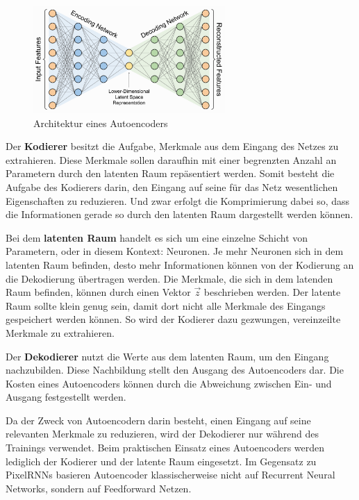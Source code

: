 \begin{figure}[H]
   \centering
   \includegraphics[width=0.65\textwidth]{images/Generative Networks/autoencoder_architecture.png}
   \caption{Architektur eines Autoencoders}
   \label{fig:Autoencoder}
\end{figure}

Der \textbf{Kodierer} besitzt die Aufgabe, Merkmale aus dem Eingang des Netzes zu extrahieren. Diese Merkmale sollen daraufhin mit einer begrenzten Anzahl an Parametern durch den latenten Raum repäsentiert werden. Somit besteht die Aufgabe des Kodierers darin, den Eingang auf seine für das Netz wesentlichen Eigenschaften zu reduzieren. Und zwar erfolgt die Komprimierung dabei so, dass die Informationen gerade so durch den latenten Raum dargestellt werden können. 

Bei dem \textbf{latenten Raum} handelt es sich um eine einzelne Schicht von Parametern, oder in diesem Kontext: Neuronen. Je mehr Neuronen sich in dem latenten Raum befinden, desto mehr Informationen können von der Kodierung an die Dekodierung übertragen werden. Die Merkmale, die sich in dem latenden Raum befinden, können durch einen Vektor $\vec{z}$ beschrieben werden. Der latente Raum sollte klein genug sein, damit dort nicht alle Merkmale des Eingangs gespeichert werden können. So wird der Kodierer dazu gezwungen, vereinzeilte Merkmale zu extrahieren. 

Der \textbf{Dekodierer} nutzt die Werte aus dem latenten Raum, um den Eingang nachzubilden. Diese Nachbildung stellt den Ausgang des Autoencoders dar. Die Kosten eines Autoencoders können durch die Abweichung zwischen Ein- und Ausgang festgestellt werden. 

Da der Zweck von Autoencodern darin besteht, einen Eingang auf seine relevanten Merkmale zu reduzieren, wird der Dekodierer nur während des Trainings verwendet. Beim praktischen Einsatz eines Autoencoders werden lediglich der Kodierer und der latente Raum eingesetzt. Im Gegensatz zu \acp{PixelRNN} basieren Autoencoder klassischerweise nicht auf Recurrent Neural Networks, sondern auf Feedforward Netzen.

